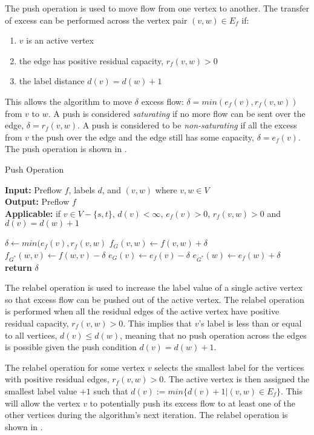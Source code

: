 \begin{definition}
	The push operation is used to move flow from one vertex to another. The transfer of excess can be performed across the vertex pair $(v,w) \in E_f$ if:
	\begin{enumerate}
		\item $v$ is an active vertex
		\item the edge has positive residual capacity, $r_f(v,w)>0$
		\item the label distance $d(v) = d(w)+1$
	\end{enumerate}
	
	This allows the algorithm to move $\delta$ excess flow: $\delta = min (e_f(v), r_f(v,w))$ from $v$ to $w$. A push is considered \textit{saturating} if no more flow can be sent over the edge, $\delta = r_f(v,w)$. A push is considered to be \textit{non-saturating} if all the excess from $v$ the push over the edge and the edge still has some capacity, $\delta = e_f(v)$. The push operation is shown in .
\end{definition}

\begin{algorithm}[!t]
	\caption{Push Operation}\label{alg:push}
	\textbf{Input:} Preflow $f$, labels $d$, and $(v,w)$ where $v,w \in V$\\
	\textbf{Output:} Preflow $f$\\
	\textbf{Applicable:} if $v \in V-\{s,t\}$, $d(v) < \infty$, $e_f(v)>0$, $r_f(v,w)>0$ and $d(v)=d(w)+1$
	\begin{algorithmic}[1]
		\State $\delta \gets min(e_f(v), r_f(v,w)$
		\State $f_G(v,w) \gets f(v,w) + \delta$
		\State $f_{G^*}(w,v) \gets f(w,v) - \delta$
		\State $e_{G}(v) \gets e_f(v) - \delta$
		\State $e_{G^*}(w) \gets e_f(w) + \delta$
		\State \textbf{return} $\delta$
		\EndProcedure
	\end{algorithmic}
\end{algorithm}
	
\begin{definition}
	The relabel operation is used to increase the label value of a single active vertex so that excess flow can be pushed out of the active vertex. The relabel operation is performed when all the residual edges of the active vertex have positive residual capacity, $r_f(v,w)>0$. This implies that $v$'s label is less than or equal to all vertices, $d(v) \leq d(w)$, meaning that no push operation across the edges is possible given the push condition $d(v) = d(w)+1$.
	
	The relabel operation for some vertex $v$ selects the smallest label for the vertices with positive residual edges, $r_f(v,w)>0$. The active vertex is then assigned the smallest label value $+1$ such that $d(v) := min\{d(v)+1 | (v,w) \in E_f\}$. This will allow the vertex $v$ to potentially push its excess flow to at least one of the other vertices during the algorithm's next iteration. The relabel operation is shown in .
\end{definition}

